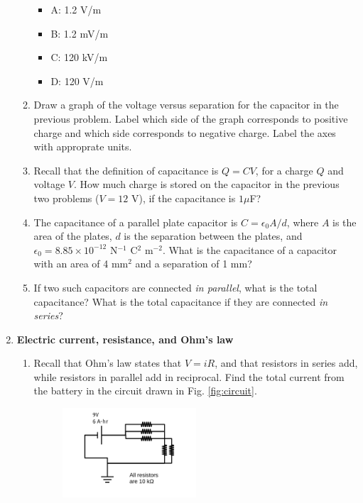 \documentclass[10pt]{article}
\begin{document}
\begin{enumerate}
\begin{enumerate}
\begin{itemize}
\item A: 1.2 V/m
\item B: 1.2 mV/m
\item C: 120 kV/m
\item D: 120 V/m
\end{itemize}
\item Draw a graph of the voltage versus separation for the capacitor in the previous problem.  Label which side of the graph corresponds to positive charge and which side corresponds to negative charge.  Label the axes with approprate units. \\ \vspace{3cm}
\item Recall that the definition of capacitance is $Q = CV$, for a charge $Q$ and voltage $V$.  How much charge is stored on the capacitor in the previous two problems ($V = 12$ V), if the capacitance is $1 \mu$F? \\ \vspace{2cm}
\item The capacitance of a parallel plate capacitor is $C = \epsilon_0 A/d$, where $A$ is the area of the plates, $d$ is the separation between the plates, and $\epsilon_0 = 8.85 \times 10^{-12}$ N$^{-1}$ C$^2$ m$^{-2}$.  What is the capacitance of a capacitor with an area of 4 mm$^2$ and a separation of 1 mm? \\ \vspace{2cm}
\item If two such capacitors are connected \textit{in parallel}, what is the total capacitance?  What is the total capacitance if they are connected \textit{in series}? \\ \vspace{2cm}
\end{enumerate}
\item \textbf{Electric current, resistance, and Ohm's law}
\begin{enumerate}
\item Recall that Ohm's law states that $V = iR$, and that resistors in series add, while resistors in parallel add in reciprocal.  Find the total current from the battery in the circuit drawn in Fig. \ref{fig:circuit}.
\begin{figure}[hb]
\centering
\includegraphics[width=0.5\textwidth]{figures/circuitExample1.pdf}

\end{figure}
\end{enumerate}
\end{enumerate}
\end{document}
